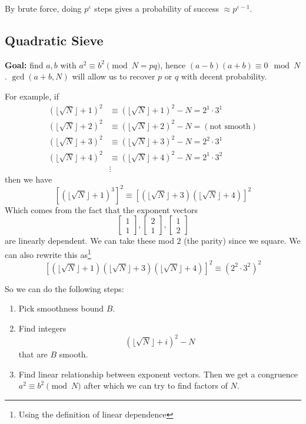 By brute force, doing $p^\varepsilon$ steps gives a probability of success $\approx p^{\varepsilon - 1}$.

\subsection{Quadratic Sieve}
\textbf{Goal:} find $a, b$ with $a^2\equiv b^2\pmod{N = pq}$, hence $(a-b)(a+b)\equiv 0\mod N$. $\gcd(a+b, N)$ will allow us to recover $p$ or $q$ with decent probability.

\begin{example}
    For example, if
    \begin{align*}
        (\lfloor\sqrt{N}\rfloor + 1)^2 & \equiv (\lfloor\sqrt{N}\rfloor + 1)^2 - N
        = 2^1\cdot 3^1                                                             \\
        (\lfloor\sqrt{N}\rfloor + 2)^2 & \equiv (\lfloor\sqrt{N}\rfloor + 2)^2 - N
        = (\text{not smooth})                                                      \\
        (\lfloor\sqrt{N}\rfloor + 3)^2 & \equiv (\lfloor\sqrt{N}\rfloor + 3)^2 - N
        = 2^2\cdot 3^1                                                             \\
        (\lfloor\sqrt{N}\rfloor + 4)^2 & \equiv (\lfloor\sqrt{N}\rfloor + 4)^2 - N
        = 2^1\cdot 3^2                                                             \\
                                       & \vdots
    \end{align*}
    then we have
    \[\left[(\lfloor\sqrt{N}\rfloor + 1)^3\right]^2 \equiv \left[(\lfloor\sqrt{N}\rfloor + 3) (\lfloor\sqrt{N}\rfloor + 4)\right]^2\]
    Which comes from the fact that the exponent vectors
    \[\begin{bmatrix}1\\1\end{bmatrix}, \begin{bmatrix}2\\1\end{bmatrix}, \begin{bmatrix}1\\2\end{bmatrix}\]
    are linearly dependent. We can take these mod $2$ (the parity) since we square. We can also rewrite this as\footnote{Using the definition of linear dependence}
    \[\left[(\lfloor\sqrt{N}\rfloor + 1)(\lfloor\sqrt{N}\rfloor + 3) (\lfloor\sqrt{N}\rfloor + 4)\right]^2\equiv \left(2^2\cdot 3^2\right)^2\]
\end{example}
So we can do the following steps:
\begin{enumerate}
    \item Pick smoothness bound $B$.
    \item Find integers
          \[(\lfloor \sqrt{N}\rfloor + i)^2 - N\]
          that are $B$ smooth.
    \item Find linear relationship between exponent vectors. Then we get a congruence $a^2\equiv b^2\pmod N$ after which we can try to find factors of $N$. 
\end{enumerate}